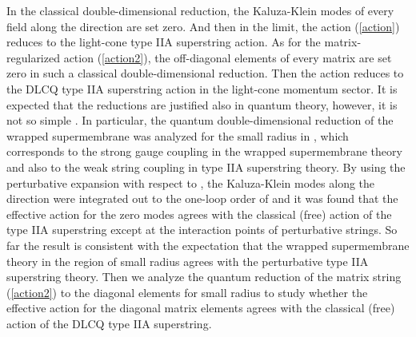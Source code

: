 \documentclass[a4paper,12pt]{article}
\begin{document}
In the classical double-dimensional reduction, the Kaluza-Klein modes
of every field along the \myHighlight{$\rho$}\coordHE{} direction are set zero.
And then in the \coordHE{} limit, the action (\ref{action}) reduces to
the light-cone type IIA superstring action.
As for the matrix-regularized action (\ref{action2}),
the off-diagonal elements of every matrix are set zero in such a
classical double-dimensional reduction.
Then the action reduces to the DLCQ type IIA superstring action
in the light-cone momentum \coordHE{} sector.
It is expected that the reductions are justified also in quantum
theory, however, it is not so simple \cite{Rus,SY}.
In particular, the quantum double-dimensional reduction of the wrapped
supermembrane was analyzed for the small radius \coordHE{} in \cite{SY},
which corresponds to the strong gauge coupling \coordHE{} in the
wrapped supermembrane theory and also to the weak string coupling
\coordHE{} in type IIA superstring theory.
By using the perturbative expansion with respect to \coordHE{}, the
Kaluza-Klein modes along the \myHighlight{$\rho$}\coordHE{} direction were integrated out to
the one-loop order of \coordHE{} and it was found that the effective
action for the zero modes agrees with the classical (free) action of
the type IIA superstring except at the interaction points of
perturbative strings.
So far the result is consistent with the expectation that the wrapped
supermembrane theory in the region of small radius \coordHE{} agrees with
the perturbative type IIA superstring theory.
Then we analyze the quantum reduction of the matrix string
(\ref{action2}) to the diagonal elements for small radius \coordHE{}
to study whether the effective action for the diagonal matrix elements
agrees with the classical (free) action of the DLCQ type IIA
superstring.

\end{document}
